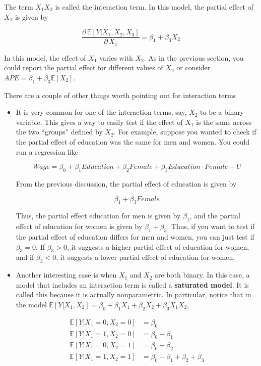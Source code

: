 \documentclass[
  letterpaper,
  DIV=11,
  numbers=noendperiod]{scrreprt}
\begin{document}
The term \(X_1 X_2\) is called the interaction term. In this model, the
partial effect of \(X_1\) is given by

\[
  \frac{\partial \, \mathbb{E}[Y|X_1,X_2,X_3]}{\partial \, X_1} = \beta_1 + \beta_3 X_2
\]

In this model, the effect of \(X_1\) varies with \(X_2\). As in the
previous section, you could report the partial effect for different
values of \(X_2\) or consider
\(APE = \beta_1 + \beta_3 \mathbb{E}[X_2]\).

There are a couple of other things worth pointing out for interaction
terms

\begin{itemize}
\item
  It is very common for one of the interaction terms, say, \(X_2\) to be
  a binary variable. This gives a way to easily test if the effect of
  \(X_1\) is the same across the two ``groups'' defined by \(X_2\). For
  example, suppose you wanted to check if the partial effect of
  education was the same for men and women. You could run a regression
  like

  \[
      Wage = \beta_0 + \beta_1 Education + \beta_2 Female + \beta_3 Education \cdot Female + U
    \]

  From the previous discussion, the partial effect of education is given
  by

  \[
      \beta_1 + \beta_3 Female
    \]

  Thus, the partial effect education for men is given by \(\beta_1\),
  and the partial effect of education for women is given by
  \(\beta_1 + \beta_3\). Thus, if you want to test if the partial effect
  of education differs for men and women, you can just test if
  \(\beta_3=0\). If \(\beta_3>0\), it suggests a higher partial effect
  of education for women, and if \(\beta_3 < 0\), it suggests a lower
  partial effect of education for women.
\item
  Another interesting case is when \(X_1\) and \(X_2\) are both binary.
  In this case, a model that includes an interaction term is called a
  \textbf{saturated model}. It is called this because it is actually
  nonparametric. In particular, notice that in the model
  \(\mathbb{E}[Y|X_1,X_2] = \beta_0 + \beta_1 X_1 + \beta_2 X_2 + \beta_3 X_1 X_2\),

  \[
    \begin{aligned}
      \mathbb{E}[Y|X_1=0,X_2=0] &= \beta_0 \\
      \mathbb{E}[Y|X_1=1,X_2=0] &= \beta_0 + \beta_1 \\
      \mathbb{E}[Y|X_1=0,X_2=1] &= \beta_0 + \beta_2 \\
      \mathbb{E}[Y|X_1=1,X_2=1] &= \beta_0 + \beta_1 + \beta_2 + \beta_3
    \end{aligned}
    \]


\end{itemize}
\end{document}
